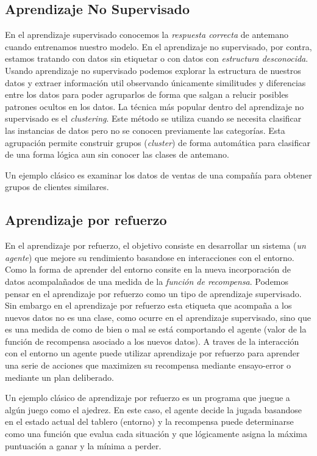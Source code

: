 \subsection{Aprendizaje No Supervisado}
En el aprendizaje supervisado conocemos la \textit{respuesta correcta} de antemano cuando entrenamos nuestro modelo. En el aprendizaje no supervisado, por contra, estamos tratando con datos sin etiquetar o con datos con \textit{estructura desconocida}. Usando aprendizaje no supervisado podemos explorar la estructura de nuestros datos y extraer información util observando únicamente similitudes y diferencias entre los datos para poder agruparlos de forma que salgan a relucir posibles patrones ocultos en los datos.  
La técnica más popular dentro del aprendizaje no supervisado es el \textit{clustering}.
Este método se utiliza cuando se necesita clasificar las instancias de datos pero no se conocen previamente las categorías. Esta agrupación permite construir grupos (\textit{cluster}) de forma automática para clasificar de una forma lógica aun sin conocer las clases de antemano. 

Un ejemplo clásico es examinar los datos de ventas de una compañía para obtener grupos de clientes similares.


\subsection{Aprendizaje por refuerzo}
En el aprendizaje por refuerzo, el objetivo consiste en desarrollar un sistema (\textit{un agente}) que mejore su rendimiento basandose en interacciones con el entorno. Como la forma de aprender del entorno consite en la nueva incorporación de datos acompalañados de una medida de la \textit{función de recompensa}. Podemos pensar en el aprendizaje por refuerzo como un tipo de aprendizaje supervisado. Sin embargo en el aprendizaje por refuerzo esta etiqueta que acompaña a los nuevos datos no es una clase, como ocurre en el aprendizaje supervisado, sino que es una medida de como de bien o mal se está comportando el agente (valor de la función de recompensa asociado a los nuevos datos).  A traves de la interacción con el entorno un agente puede utilizar aprendizaje por refuerzo para aprender una serie de acciones que maximizen su recompensa mediante ensayo-error o mediante un plan deliberado.  

Un ejemplo clásico de aprendizaje por refuerzo es un programa que juegue a algún juego como el ajedrez. En este caso, el agente decide la jugada basandose en el estado actual del tablero (entorno) y la recompensa puede determinarse como una función que evalua cada situación y que lógicamente asigna la máxima puntuación a ganar y la mínima a perder.


